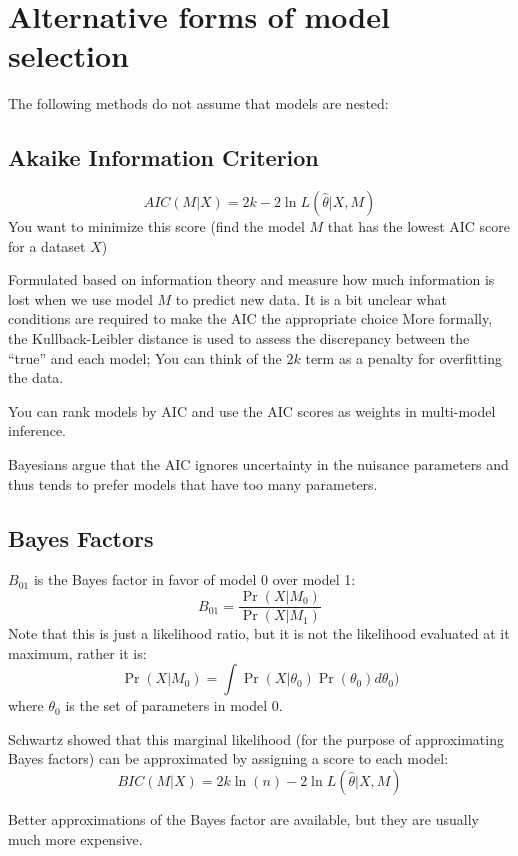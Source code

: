 \documentclass[11pt]{article}
\begin{document}
\section*{Alternative forms of model selection}
The following methods do not assume that models are nested:
\subsection*{Akaike Information Criterion}
	$$AIC(M|X) = 2k - 2 \ln L(\hat\theta | X, M)$$
You want to minimize this score (find the model $M$ that has the lowest AIC score for a dataset $X$)

Formulated based on information theory and measure how much information is lost when we use model $M$ to predict new data.
It is a bit unclear what conditions are required to make the AIC the appropriate choice 
More formally, the Kullback-Leibler distance is used to assess the discrepancy between the ``true'' and each model; You can think of the $2k$ term as a penalty for overfitting the data.

You can rank models by AIC and use the AIC scores as weights in multi-model inference.

Bayesians argue that the AIC ignores uncertainty in the nuisance parameters and thus tends to prefer models that have too many parameters.

\subsection*{Bayes Factors}
$B_{01}$ is the Bayes factor in favor of model 0 over model 1:
$$B_{01} = \frac{\Pr(X|M_0)}{\Pr(X|M_1)}$$
Note that this is just a likelihood ratio, but it is not the likelihood evaluated at it maximum, rather it is:
\begin{equation}
	\Pr(X|M_0) = \int \Pr(X|\theta_0)\Pr(\theta_0) d\theta_0) \label{margLike}
\end{equation}
where $\theta_0$ is the set of parameters in model 0.

Schwartz showed that this marginal likelihood (for the purpose of approximating Bayes factors) can be approximated by assigning a score to each model:
	$$BIC(M|X) = 2k\ln(n) - 2 \ln L(\hat\theta | X, M)$$

Better approximations of the Bayes factor are available, but they are usually much more expensive.
\end{document}
